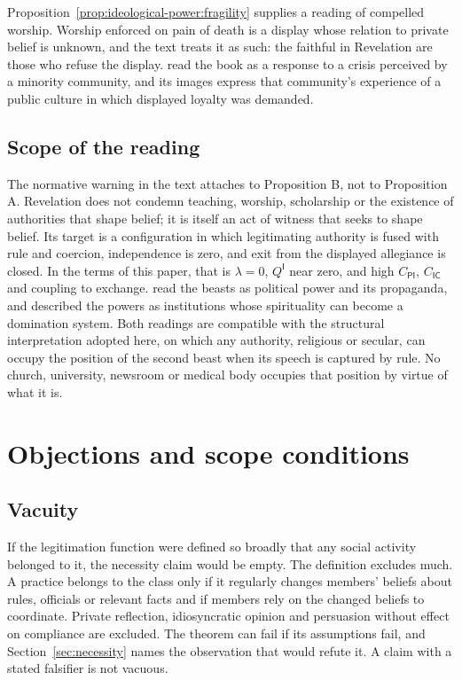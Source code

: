 \documentclass[11pt,letterpaper]{article}
\theoremstyle{definition}
\theoremstyle{remark}
\newcommand{\pP}{\mathsf{P}}
\newcommand{\pI}{\mathsf{I}}
\newcommand{\pC}{\mathsf{C}}
\begin{document}
Proposition~\ref{prop:ideological-power:fragility} supplies a reading of compelled worship. Worship enforced on pain of death is a display whose relation to private belief is unknown, and the text treats it as such: the faithful in Revelation are those who refuse the display. \citet{collins1984} read the book as a response to a crisis perceived by a minority community, and its images express that community's experience of a public culture in which displayed loyalty was demanded.

\subsection{Scope of the reading}

The normative warning in the text attaches to Proposition B, not to Proposition A. Revelation does not condemn teaching, worship, scholarship or the existence of authorities that shape belief; it is itself an act of witness that seeks to shape belief. Its target is a configuration in which legitimating authority is fused with rule and coercion, independence is zero, and exit from the displayed allegiance is closed. In the terms of this paper, that is $\lambda=0$, $Q^{\pI}$ near zero, and high $C_{\pP\pI}$, $C_{\pI\pC}$ and coupling to exchange. \citet{ellul1977} read the beasts as political power and its propaganda, and \citet{wink1992} described the powers as institutions whose spirituality can become a domination system. Both readings are compatible with the structural interpretation adopted here, on which any authority, religious or secular, can occupy the position of the second beast when its speech is captured by rule. No church, university, newsroom or medical body occupies that position by virtue of what it is.

\section{Objections and scope conditions}
\label{sec:objections}

\subsection{Vacuity}

If the legitimation function were defined so broadly that any social activity belonged to it, the necessity claim would be empty. The definition excludes much. A practice belongs to the class only if it regularly changes members' beliefs about rules, officials or relevant facts and if members rely on the changed beliefs to coordinate. Private reflection, idiosyncratic opinion and persuasion without effect on compliance are excluded. The theorem can fail if its assumptions fail, and Section~\ref{sec:necessity} names the observation that would refute it. A claim with a stated falsifier is not vacuous.
\end{document}
